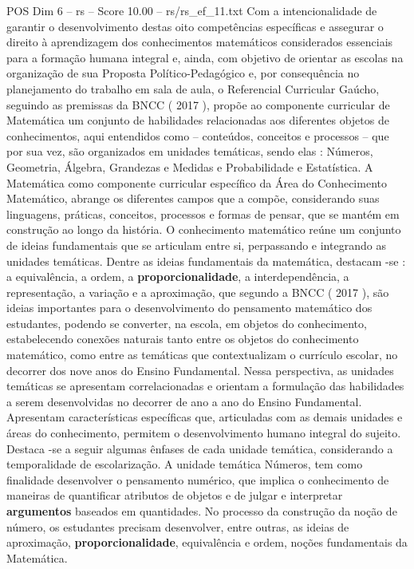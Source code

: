 \begin{textsample}{POS Dim 6 – rs – Score 10.00 – rs/rs\_ef\_11.txt}
Com a intencionalidade de garantir o desenvolvimento destas oito competências específicas e assegurar o direito à aprendizagem dos conhecimentos matemáticos considerados essenciais para a formação humana integral e, ainda, com objetivo de orientar as escolas na organização de sua Proposta Político-Pedagógico e, por consequência no planejamento do trabalho em sala de aula, o Referencial Curricular Gaúcho, seguindo as premissas da BNCC ( 2017 ), propõe ao componente curricular de Matemática um conjunto de habilidades relacionadas aos diferentes objetos de conhecimentos, aqui entendidos como – conteúdos, conceitos e processos – que por sua vez, são organizados em unidades temáticas, sendo elas : Números, Geometria, Álgebra, Grandezas e Medidas e Probabilidade e Estatística.
A Matemática como componente curricular específico da Área do Conhecimento Matemático, abrange os diferentes campos que a compõe, considerando suas linguagens, práticas, conceitos, processos e formas de pensar, que se mantém em construção ao longo da história.
O conhecimento matemático reúne um conjunto de ideias fundamentais que se articulam entre si, perpassando e integrando as unidades temáticas.
Dentre as ideias fundamentais da matemática, destacam -se : a equivalência, a ordem, a \textbf{proporcionalidade}, a interdependência, a representação, a variação e a aproximação, que segundo a BNCC ( 2017 ), são ideias importantes para o desenvolvimento do pensamento matemático dos estudantes, podendo se converter, na escola, em objetos do conhecimento, estabelecendo conexões naturais tanto entre os objetos do conhecimento matemático, como entre as temáticas que contextualizam o currículo escolar, no decorrer dos nove anos do Ensino Fundamental.
Nessa perspectiva, as unidades temáticas se apresentam correlacionadas e orientam a formulação das habilidades a serem desenvolvidas no decorrer de ano a ano do Ensino Fundamental.
Apresentam características específicas que, articuladas com as demais unidades e áreas do conhecimento, permitem o desenvolvimento humano integral do sujeito.
Destaca -se a seguir algumas ênfases de cada unidade temática, considerando a temporalidade de escolarização.
A unidade temática Números, tem como finalidade desenvolver o pensamento numérico, que implica o conhecimento de maneiras de quantificar atributos de objetos e de julgar e interpretar \textbf{argumentos} baseados em quantidades.
No processo da construção da noção de número, os estudantes precisam desenvolver, entre outras, as ideias de aproximação, \textbf{proporcionalidade}, equivalência e ordem, noções fundamentais da Matemática.

\end{textsample}
